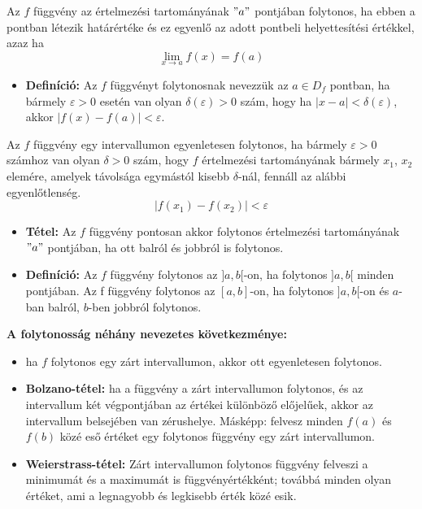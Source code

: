 \documentclass[12pt,a4paper]{article}
\begin{document}
\begin{tcolorbox}[colback=green!5!white,colframe=green!60!black,title= 3. Függvény folytonosság]
    Az \(f\) függvény az értelmezési tartományának \("a"\) pontjában folytonos, ha ebben a pontban
létezik határértéke és ez egyenlő az adott pontbeli helyettesítési értékkel, azaz ha
$$\lim_{x \to a} f(x) = f(a) $$
    \begin{itemize}
        \item \textbf{Definíció:} Az \(f\) függvényt folytonosnak nevezzük az \(a \in D_f\) pontban, ha bármely \(\varepsilon > 0\)
        esetén van olyan \(\delta(\varepsilon) > 0\) szám, hogy ha \(|x - a| < \delta(\varepsilon)\), akkor \(|f(x) - f(a)| < \varepsilon\).
    \end{itemize}
    Az \(f\) függvény egy intervallumon egyenletesen folytonos, ha bármely \(\varepsilon > 0\) számhoz van
    olyan \(\delta > 0\) szám, hogy \(f\) értelmezési tartományának bármely \(x_1\), \(x_2\) elemére, amelyek
    távolsága egymástól kisebb \(\delta\)-nál, fennáll az alábbi egyenlőtlenség.
    $$|f(x_1) - f(x_2)| < \varepsilon$$
    \begin{itemize}
        \item \textbf{Tétel:} Az \(f\) függvény pontosan akkor folytonos értelmezési tartományának \("a"\) pontjában, ha
        ott balról és jobbról is folytonos.
        \item \textbf{Definíció:} Az \(f\) függvény folytonos az \( ] a, b [ \)-on, ha folytonos \(]a, b[ \) minden pontjában.
        Az f függvény folytonos az \([a, b]\)-on, ha folytonos \(]a, b[\)-on és \(a\)-ban balról, \(b\)-ben
        jobbról folytonos.
    \end{itemize}
    \textbf{A folytonosság néhány nevezetes következménye:}
    \begin{itemize}
        \item ha \(f\) folytonos egy zárt intervallumon, akkor ott egyenletesen folytonos.
        \item \textbf{Bolzano-tétel:} ha a függvény a zárt intervallumon folytonos, és az intervallum két
        végpontjában az értékei különböző előjelűek, akkor az intervallum belsejében van
        zérushelye. Másképp: felvesz minden \(f(a)\) és \(f(b)\) közé eső értéket egy folytonos függvény egy zárt intervallumon.
        \item \textbf{Weierstrass-tétel:} Zárt intervallumon folytonos függvény felveszi a minimumát és a
        maximumát is függvényértékként; továbbá minden olyan értéket, ami a legnagyobb és
        legkisebb érték közé esik.
    \end{itemize}

\end{tcolorbox}
\end{document}
